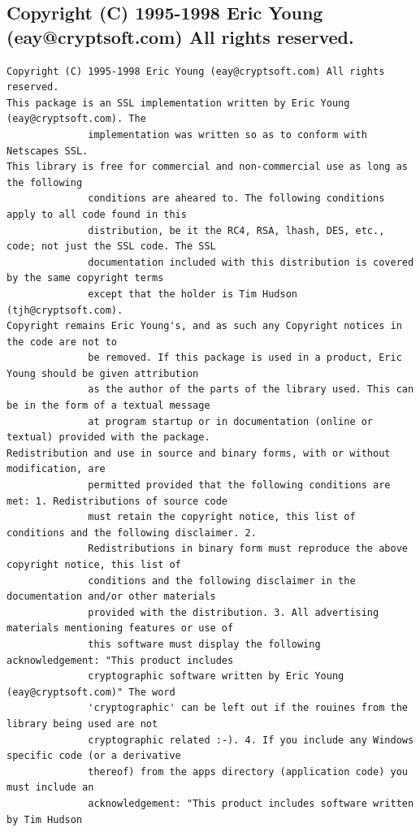 \subsection{Copyright (C) 1995-1998 Eric Young (eay@cryptsoft.com) All rights reserved.}

\begin{lstlisting}[basicstyle=\ttfamily\scriptsize,breaklines=true]
Copyright (C) 1995-1998 Eric Young (eay@cryptsoft.com) All rights reserved.
This package is an SSL implementation written by Eric Young (eay@cryptsoft.com). The
              implementation was written so as to conform with Netscapes SSL.
This library is free for commercial and non-commercial use as long as the following
              conditions are aheared to. The following conditions apply to all code found in this
              distribution, be it the RC4, RSA, lhash, DES, etc., code; not just the SSL code. The SSL
              documentation included with this distribution is covered by the same copyright terms
              except that the holder is Tim Hudson (tjh@cryptsoft.com).
Copyright remains Eric Young's, and as such any Copyright notices in the code are not to
              be removed. If this package is used in a product, Eric Young should be given attribution
              as the author of the parts of the library used. This can be in the form of a textual message
              at program startup or in documentation (online or textual) provided with the package.
Redistribution and use in source and binary forms, with or without modification, are
              permitted provided that the following conditions are met: 1. Redistributions of source code
              must retain the copyright notice, this list of conditions and the following disclaimer. 2.
              Redistributions in binary form must reproduce the above copyright notice, this list of
              conditions and the following disclaimer in the documentation and/or other materials
              provided with the distribution. 3. All advertising materials mentioning features or use of
              this software must display the following acknowledgement: "This product includes
              cryptographic software written by Eric Young (eay@cryptsoft.com)" The word
              'cryptographic' can be left out if the rouines from the library being used are not
              cryptographic related :-). 4. If you include any Windows specific code (or a derivative
              thereof) from the apps directory (application code) you must include an
              acknowledgement: "This product includes software written by Tim Hudson

\end{lstlisting}
